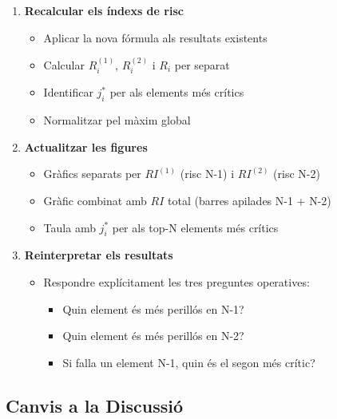 \documentclass[11pt,a4paper]{article}
\begin{document}
\begin{enumerate}
    \item \textbf{Recalcular els índexs de risc}
    \begin{itemize}
        \item Aplicar la nova fórmula als resultats existents
        \item Calcular $R_i^{(1)}$, $R_i^{(2)}$ i $R_i$ per separat
        \item Identificar $j^*_i$ per als elements més crítics
        \item Normalitzar pel màxim global
    \end{itemize}
    
    \item \textbf{Actualitzar les figures}
    \begin{itemize}
        \item Gràfics separats per $RI^{(1)}$ (risc N-1) i $RI^{(2)}$ (risc N-2)
        \item Gràfic combinat amb $RI$ total (barres apilades N-1 + N-2)
        \item Taula amb $j^*_i$ per als top-N elements més crítics
    \end{itemize}
    
    \item \textbf{Reinterpretar els resultats}
    \begin{itemize}
        \item Respondre explícitament les tres preguntes operatives:
        \begin{itemize}
            \item Quin element és més perillós en N-1?
            \item Quin element és més perillós en N-2?
            \item Si falla un element N-1, quin és el segon més crític?
        \end{itemize}
    \end{itemize}
\end{enumerate}

\subsection{Canvis a la Discussió}
\end{document}

